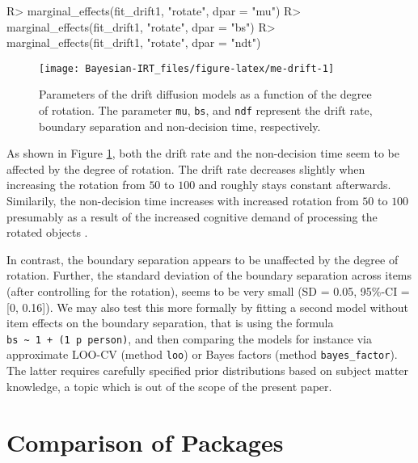 \documentclass[jss]{jss}
\begin{document}
\begin{CodeChunk}

\begin{CodeInput}
R> marginal_effects(fit_drift1, "rotate", dpar = "mu")
R> marginal_effects(fit_drift1, "rotate", dpar = "bs")
R> marginal_effects(fit_drift1, "rotate", dpar = "ndt")
\end{CodeInput}
\end{CodeChunk}

\begin{CodeChunk}
\begin{figure}

{\centering \texttt{[image: Bayesian-IRT\_files/figure-latex/me-drift-1]} 

}

\caption[Parameters of the drift diffusion models as a function of the degree of rotation]{Parameters of the drift diffusion models as a function of the degree of rotation. The parameter \texttt{mu}, \texttt{bs}, and \texttt{ndf} represent the drift rate, boundary separation and non-decision time, respectively.}\label{fig:me-drift}
\end{figure}
\end{CodeChunk}

As shown in Figure \ref{fig:me-drift}, both the drift rate and the
non-decision time seem to be affected by the degree of rotation. The
drift rate decreases slightly when increasing the rotation from \(50\)
to \(100\) and roughly stays constant afterwards. Similarily, the
non-decision time increases with increased rotation from \(50\) to
\(100\) presumably as a result of the increased cognitive demand of
processing the rotated objects \citep{diffIRT}.

In contrast, the boundary separation appears to be unaffected by the
degree of rotation. Further, the standard deviation of the boundary
separation across items (after controlling for the rotation), seems to
be very small (SD = 0.05, 95\%-CI = {[}0, 0.16{]}). We may also test
this more formally by fitting a second model without item effects on the
boundary separation, that is using the formula
\texttt{bs\ \textasciitilde{}\ 1\ +\ (1\ \textbar{}p\textbar{}\ person)},
and then comparing the models for instance via approximate LOO-CV
(method \texttt{loo}) or Bayes factors (method \texttt{bayes\_factor}).
The latter requires carefully specified prior distributions based on
subject matter knowledge, a topic which is out of the scope of the
present paper.

\hypertarget{comparison}{%
\section{Comparison of Packages}\label{comparison}}
\end{document}
